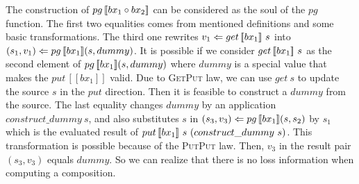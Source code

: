 The construction of $pg \, [\![bx_1 \circ bx_2]\!]$ can be considered as the soul of the $pg$ function. The first two equalities comes from mentioned definitions and some basic transformations. The third one rewrites $v_1 \Leftarrow get \, [\![bx_1]\!] \ s$ into $(s_1, v_1) \Leftarrow pg \, [\![bx_1]\!] (s, dummy)$. It is possible if we consider $get \, [\![bx_1]\!] \ s$ as the second element of $pg \, [\![bx_1]\!] (s, dummy)$ where $dummy$ is a special value that makes the $put \, [\![bx_1]\!]$ valid. Due to \textsc{GetPut} law, we can use $get \ s$ to update the source $s$ in the $put$ direction. Then it is feasible to construct a $dummy$ from the source. The last equality changes $dummy$ by an application $construct\_dummy \ s$, and also substitutes $s$ in $(s_3, v_3) \Leftarrow pg \, [\![bx_1]\!] (s, s_2)$ by $s_1$ which is the evaluated result of $put \, [\![bx_1]\!] \ s \ (construct\_dummy \ s)$. This transformation is possible because of the \textsc{PutPut} law. Then, $v_3$ in the result pair $(s_3,v_3)$ equals $dummy$. So we can realize that there is no loss information when computing a composition.